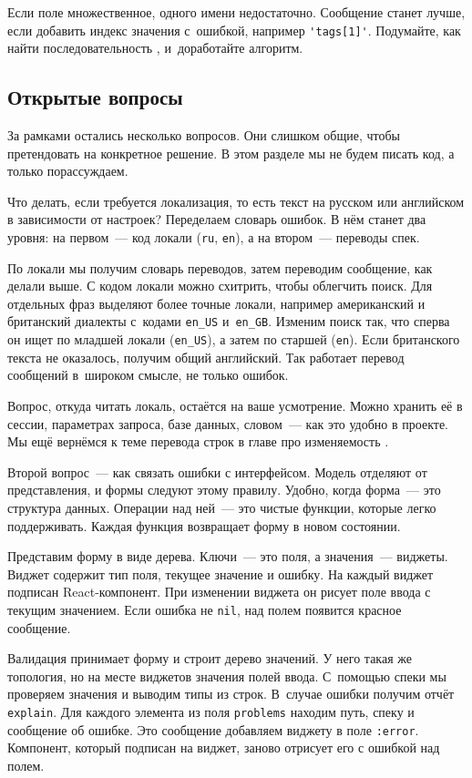 Если поле множественное, одного имени недостаточно. Сообщение станет лучше, если
добавить индекс значения с~ошибкой, например \verb|'tags[1]'|. Подумайте, как
найти последовательность , и~доработайте алгоритм.

\subsection{Открытые вопросы}

За рамками остались несколько вопросов. Они слишком общие, чтобы претендовать на
конкретное решение. В этом разделе мы не будем писать код, а только
порассуждаем.

Что делать, если требуется локализация, то есть текст на русском или английском
в зависимости от настроек? Переделаем словарь ошибок. В нём станет два уровня:
на первом~--- код локали (\verb|ru|, \verb|en|), а на втором~--- переводы спек.


По локали мы получим словарь переводов, затем переводим сообщение, как делали
выше. С кодом локали можно схитрить, чтобы облегчить поиск. Для отдельных фраз
выделяют более точные локали, например американский и британский диалекты
с~кодами \verb|en_US| и~\verb|en_GB|. Изменим поиск так, что сперва он ищет
по младшей локали (\verb|en_US|), а затем по старшей (\verb|en|). Если
британского текста не оказалось, получим общий английский. Так работает перевод
сообщений в~широком смысле, не только ошибок.

Вопрос, откуда читать локаль, остаётся на ваше усмотрение. Можно хранить её в
сессии, параметрах запроса, базе данных, словом~--- как это удобно в проекте. Мы
ещё вернёмся к теме перевода строк в главе про изменяемость .

Второй вопрос~--- как связать ошибки с интерфейсом. Модель отделяют от
представления, и формы следуют этому правилу. Удобно, когда форма~--- это структура
данных. Операции над ней~--- это чистые функции, которые легко поддерживать. Каждая
функция возвращает форму в новом состоянии.

Представим форму в виде дерева. Ключи~--- это поля, а значения~--- виджеты. Виджет
содержит тип поля, текущее значение и ошибку. На каждый виджет подписан
React-компонент. При изменении виджета он рисует поле ввода с текущим
значением. Если ошибка не \verb|nil|, над полем появится красное сообщение.

Валидация принимает форму и строит дерево значений. У него такая же топология, но
на месте виджетов значения полей ввода. С~помощью спеки мы проверяем значения и
выводим типы из строк. В~случае ошибки получим отчёт \verb|explain|. Для
каждого элемента из поля \verb|problems| находим путь, спеку и сообщение об
ошибке. Это сообщение добавляем виджету в поле \verb|:error|. Компонент,
который подписан на виджет, заново отрисует его с ошибкой над полем.

